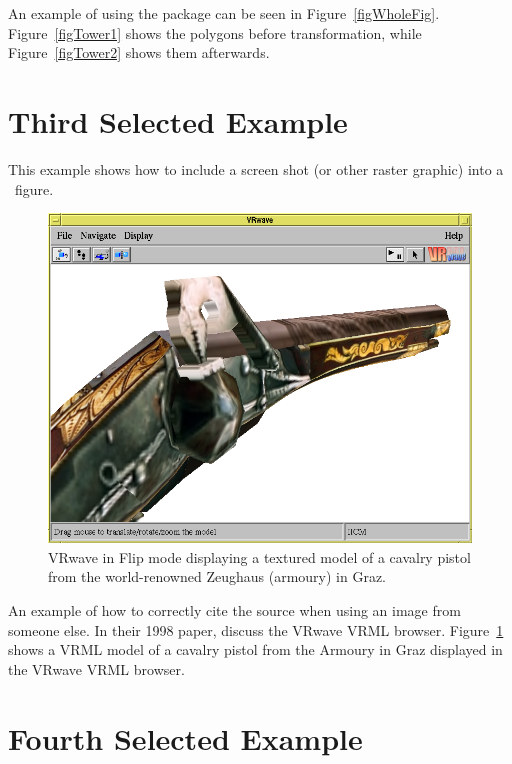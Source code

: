An example of using the  package can be seen in
Figure~\ref{figWholeFig}. Figure~\ref{figTower1} shows the polygons
before transformation, while Figure~\ref{figTower2} shows them
afterwards.




\section{Third Selected Example}


This example shows how to include a screen shot (or other raster
graphic) into a \LaTeXe\ figure.

\begin{figure}[tbp]
\centering
\includegraphics[keepaspectratio,width=\hsize]{images/pist}

\caption[VRwave in Flip Mode]
{%
VRwave in Flip mode displaying a textured model of a cavalry pistol
from the world-renowned Zeughaus (armoury) in Graz.
}
\label{fig:Pistol}
\end{figure}


An example of how to correctly cite the source when using an image
from someone else. In their 1998 paper, \citet{Andrews-VRwave} discuss
the VRwave VRML browser. Figure~\ref{fig:Pistol} shows a VRML model of
a cavalry pistol from the Armoury in Graz displayed in the VRwave VRML
browser.





\section{Fourth Selected Example}

